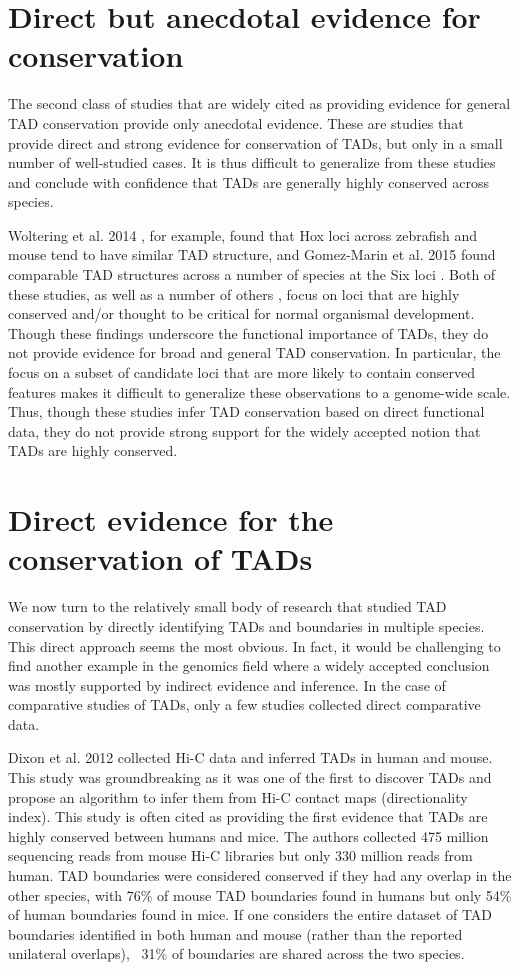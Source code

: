 \section{Direct but anecdotal evidence for conservation}
The second class of studies that are widely cited as providing evidence for general TAD conservation provide only anecdotal evidence. These are studies that provide direct and strong evidence for conservation of TADs, but only in a small number of well-studied cases. It is thus difficult to generalize from these studies and conclude with confidence that TADs are generally highly conserved across species.

Woltering et al. 2014 \cite{Woltering.2014}, for example, found that Hox loci across zebrafish and mouse tend to have similar TAD structure, and Gomez-Marin et al. 2015 found comparable TAD structures across a number of species at the Six loci \cite{Gómez-Marín.2015}. Both of these studies, as well as a number of others \cite{Smith.2016, Lupiáñez.2015, Galupa.2018, Galupa.2020}, focus on loci that are highly conserved and/or thought to be critical for normal organismal development. Though these findings underscore the functional importance of TADs, they do not provide evidence for broad and general TAD conservation. In particular, the focus on a subset of candidate loci that are more likely to contain conserved features makes it difficult to generalize these observations to a genome-wide scale. Thus, though these studies infer TAD conservation based on direct functional data, they do not provide strong support for the widely accepted notion that TADs are highly conserved. 

\section{Direct evidence for the conservation of TADs}
We now turn to the relatively small body of research that studied TAD conservation by directly identifying TADs and boundaries in multiple species. This direct approach seems the most obvious. In fact, it would be challenging to find another example in the genomics field where a widely accepted conclusion was mostly supported by indirect evidence and inference. In the case of comparative studies of TADs, only a few studies collected direct comparative data.

Dixon et al. 2012 \cite{Dixon.2012} collected Hi-C data and inferred TADs in human and mouse. This study was groundbreaking as it was one of the first to discover TADs and propose an algorithm to infer them from Hi-C contact maps (directionality index). This study is often cited as providing the first evidence that TADs are highly conserved between humans and mice. The authors collected 475 million sequencing reads from mouse Hi-C libraries but only 330 million reads from human. TAD boundaries were considered conserved if they had any overlap in the other species, with 76\% of mouse TAD boundaries found in humans but only 54\% of human boundaries found in mice. If one considers the entire dataset of TAD boundaries identified in both human and mouse (rather than the reported unilateral overlaps), ~31\% of boundaries are shared across the two species.

